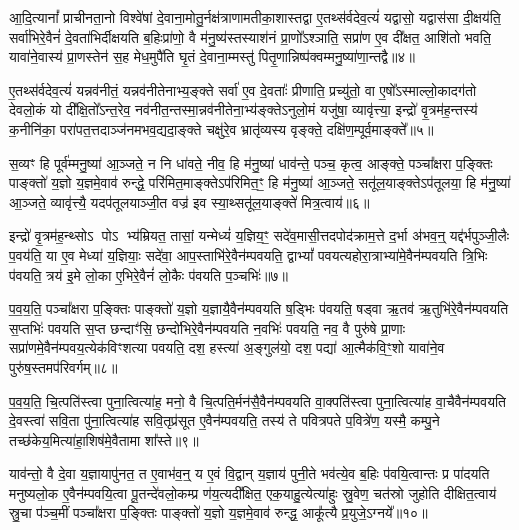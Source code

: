 आ॒दि॒त्यानां᳚ प्राचीनता॒नो विश्वे॑षां दे॒वाना॒मोतु॒र्नक्ष॑त्राणामतीका॒शास्तद्वा ए॒तथ्स॑र्वदेव॒त्यं॑ यद्वासो॒ यद्वास॑सा दी॒क्षय॑ति॒ सर्वा॑भिरे॒वैनं॑ दे॒वता॑भिर्दीक्षयति ब॒हिःप्रा॑णो॒ वै म॑नु॒ष्य॑स्तस्याश॑नं प्रा॒णो᳚\-ऽश्ञाति॒ सप्रा॑ण ए॒व दी᳚क्षत॒ आशि॑तो भवति॒ यावा॑ने॒वास्य॑ प्रा॒णस्तेन॑ स॒ह मेध॒मुपै॑ति घृ॒तं दे॒वाना॒म्मस्तु॑ पितृ॒णान्निष्प॑क्वम्मनु॒ष्या॑णा॒न्तद्वै॥४॥

ए॒तथ्स॑र्वदेव॒त्यं॑ यन्नव॑नीतं॒ यन्नव॑नीतेनाभ्य॒ङ्क्ते सर्वा॑ ए॒व दे॒वताः᳚ प्रीणाति॒ प्रच्यु॑तो॒ वा ए॒षो᳚\-ऽस्माल्लो॒कादग॑तो देवलो॒कं यो दी᳚क्षि॒तो᳚\-ऽन्त॒रेव॒ नव॑नीत॒न्तस्मा॒न्नव॑नीतेना॒भ्य॑ङ्क्ते\-ऽनुलो॒मं यजु॑षा॒ व्यावृ॑त्त्या॒ इन्द्रो॑ वृ॒त्रम॑ह॒न्तस्य॑ क॒नीनि॑का॒ परा॑पत॒त्तदाञ्ज॑नमभव॒द्यदा॒ङ्क्ते चक्षु॑रे॒व भ्रातृ॑व्यस्य वृङ्क्ते॒ दक्षि॑ण॒म्पूर्व॒माङ्क्ते᳚॥५॥

स॒व्यꣳ हि पूर्व॑म्मनु॒ष्या॑ आ॒ञ्जते॒ न नि धा॑वते॒ नीव॒ हि म॑नु॒ष्या॑ धाव॑न्ते॒ पञ्च॒ कृत्व॒ आङ्क्ते॒ पञ्चा᳚क्षरा प॒ङ्क्तिः पाङ्क्तो॑ य॒ज्ञो य॒ज्ञमे॒वाव॑ रुन्द्धे॒ परि॑मित॒माङ्क्ते\-ऽप॑रिमित॒ꣳ॒ हि म॑नु॒ष्या॑ आ॒ञ्जते॒ सतू॑ल॒याङ्क्ते\-ऽप॑तूलया॒ हि म॑नु॒ष्या॑ आ॒ञ्जते॒ व्यावृ॑त्त्यै॒ यदप॑तूलयाञ्जी॒त वज्र॑ इव स्या॒थ्सतू॑ल॒याङ्क्ते॑ मित्र॒त्वाय॑॥६॥

इन्द्रो॑ वृ॒त्रम॑ह॒न्थ्सो\-ऽ पो\-ऽ भ्य॑म्रियत॒ तासां॒ यन्मेध्यं॑ य॒ज्ञिय॒ꣳ॒ सदे॑व॒मासी॒त्तदपोद॑क्राम॒त्ते द॒र्भा अ॑भव॒न्॒ यद्द॑र्भपुञ्जी॒लैः प॒वय॑ति॒ या ए॒व मेध्या॑ य॒ज्ञियाः॒ सदे॑वा॒ आप॒स्ताभि॑रे॒वैन॑म्पवयति॒ द्वा\-भ्यां᳚ पवयत्यहोरा॒त्राभ्या॑मे॒वैन॑म्पवयति त्रि॒भिः प॑वयति॒ त्रय॑ इ॒मे लो॒का ए॒भिरे॒वैनं॑ लो॒कैः प॑वयति प॒ञ्चभिः॑॥७॥

प॒व॒य॒ति॒ पञ्चा᳚क्षरा प॒ङ्क्तिः पाङ्क्तो॑ य॒ज्ञो य॒ज्ञायै॒वैन॑म्पवयति ष॒ड्भिः प॑वयति॒ षड्वा ऋ॒तव॑ ऋ॒तुभि॑रे॒वैन॑म्पवयति स॒प्तभिः॑ पवयति स॒प्त छन्दाꣳ॑सि॒ छन्दो॑भिरे॒वैन॑म्पवयति न॒वभिः॑ पवयति॒ नव॒ वै पुरु॑षे प्रा॒णाः सप्रा॑णमे॒वैन॑म्पव\-य॒त्येक॑विꣳशत्या पवयति॒ दश॒ हस्त्या॑ अ॒ङ्गुल॑यो॒ दश॒ पद्या॑ आ॒त्मैक॑वि॒ꣳ॒शो यावा॑ने॒व पुरु॑ष॒स्तमप॑रिवर्गम्॥८॥

प॒व॒य॒ति॒ चि॒त्पति॑स्त्वा पुना॒त्वित्या॑ह॒ मनो॒ वै चि॒त्पति॒र्मन॑सै॒वैन॑म्पवयति वा॒क्पति॑स्त्वा पुना॒त्वित्या॑ह वा॒चैवैन॑म्पवयति दे॒वस्त्वा॑ सवि॒ता पु॑ना॒त्वित्या॑ह सवि॒तृप्र॑सूत ए॒वैन॑म्पवयति॒ तस्य॑ ते पवित्रपते प॒वित्रे॑ण॒ यस्मै॒ कम्पु॒ने तच्छ॑केय॒मित्या॑हा॒शिष॑मे॒वैतामा शा᳚स्ते॥९॥

{}

याव॑न्तो॒ वै दे॒वा य॒ज्ञायापु॑नत॒ त ए॒वाभ॑व॒न्॒ य ए॒वं वि॒द्वान् य॒ज्ञाय॑ पुनी॒ते भव॑त्ये॒व ब॒हिः प॑वयि॒त्वान्तः प्र पा॑दयति मनुष्यलो॒क ए॒वैन॑म्पवयि॒त्वा पू॒तन्दे॑वलो॒कम्प्र ण॑य॒त्यदी᳚क्षित॒ एक॒याहु॒त्येत्या॑हुः स्रु॒वेण॒ चत॑स्रो जुहोति दीक्षित॒त्वाय॑ स्रु॒चा प॑ञ्च॒मीं पञ्चा᳚क्षरा प॒ङ्क्तिः पाङ्क्तो॑ य॒ज्ञो य॒ज्ञमे॒वाव॑ रुन्द्ध॒ आकू᳚त्यै प्र॒युजे॒\-ऽग्नये᳚॥१०॥

